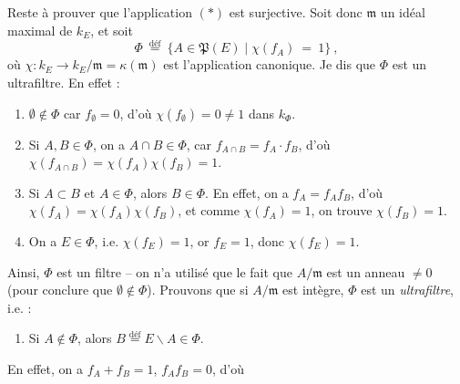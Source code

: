 \documentclass[11pt]{article}
\newcommand{\msp}[1]{\marginpar{\footnotesize [#1]}}
\newcommand{\defeq}{\overset{\text{déf}}{=}}
\begin{document}
\msp{page 6}
\noindent Reste à prouver que l'application $(*)$ est surjective. Soit donc $\mathfrak{m}$ un idéal maximal de $k_E$, et soit
\[
\Phi \ \defeq \ \{A\in\mathfrak{P}(E)\mid\chi(f_A) \ = \ 1\} \ ,
\]
où $\chi : k_E\longrightarrow k_E/\mathfrak{m}=\kappa(\mathfrak{m})$ est l'application canonique. Je dis que $\Phi$ est un ultrafiltre. En effet :
\begin{enumerate}
\item[a)] $\emptyset\notin\Phi$ car $f_\emptyset=0$, d'où $\chi(f_\emptyset)=0\neq1$ dans $k_\Phi$.
\item[b)] Si $A,B\in\Phi$, on a $A\cap B\in\Phi$, car $f_{A\cap B}=f_A\cdot f_B$, d'où $\chi(f_{A\cap B})=\chi(f_A)\chi(f_B)=1$.
\item[c)] Si $A\subset B$ et $A\in\Phi$, alors $B\in\Phi$. En effet, on a $f_A=f_Af_B$, d'où $\chi(f_A)=\chi(f_A)\chi(f_B)$, et comme $\chi(f_A)=1$, on trouve $\chi(f_B)=1$.
\item[d)] On a $E\in\Phi$, i.e. $\chi(f_E)=1$, or $f_E=1$, donc $\chi(f_E)=1$.
\end{enumerate}
Ainsi, $\Phi$ est un filtre -- on n'a utilisé que le fait que $A/\mathfrak{m}$ est un anneau $\neq0$ (pour conclure que $\emptyset\notin\Phi$). Prouvons que si $A/\mathfrak{m}$ est intègre, $\Phi$ est un \textit{ultrafiltre}, i.e. :
\begin{enumerate}
\item[e)] Si $A\notin\Phi$, alors $B\defeq E\backslash A\in\Phi$.
\end{enumerate}
En effet, on a $f_A+f_B=1$, $f_Af_B=0$, d'où
\end{document}

